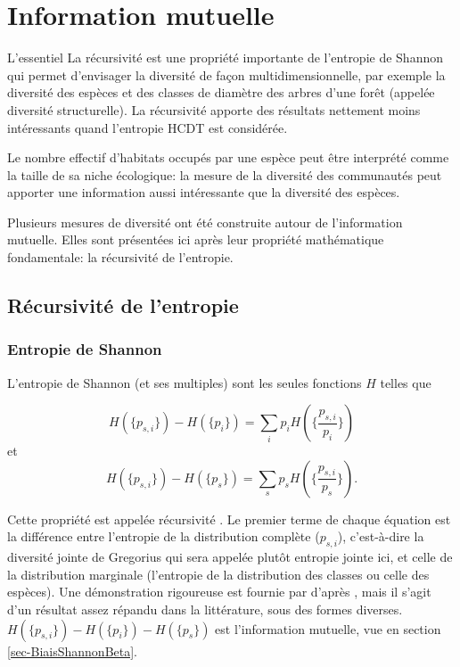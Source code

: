\documentclass[
  11pt,
  french,
  a4paper,
  extrafontsizes,onecolumn,openright
  ]{memoir}
\newenvironment{Summary}
  {\begin{bclogo}[logo=\bctrombone, noborder=true, couleur=lightgray!50]{L'essentiel}\parindent0pt}
  {\end{bclogo}}
\begin{document}
\normalsize

\chapter{Information mutuelle}\label{information-mutuelle}

\begin{Summary}
La récursivité est une propriété importante de l'entropie de Shannon qui permet d'envisager la diversité de façon multidimensionnelle, par exemple la diversité des espèces et des classes de diamètre des arbres d'une forêt (appelée diversité structurelle). La récursivité apporte des résultats nettement moins intéressants quand l'entropie HCDT est considérée.

Le nombre effectif d'habitats occupés par une espèce peut être interprété comme la taille de sa niche écologique: la mesure de la diversité des communautés peut apporter une information aussi intéressante que la diversité des espèces.

\end{Summary}

Plusieurs mesures de diversité ont été construite autour de l'information mutuelle.
Elles sont présentées ici après leur propriété mathématique fondamentale: la récursivité de l'entropie.

\section{Récursivité de l'entropie}\label{ruxe9cursivituxe9-de-lentropie}

\subsection{Entropie de Shannon}\label{sec-jointeShannon}

L'entropie de Shannon (et ses multiples) sont les seules fonctions \(H\) telles que

\begin{equation}
  \label{eq:Recursivite1}
  H\left(\{p_{s,i}\}\right)-H\left(\{p_i\}\right) 
  = \sum_i{p_i H\left(\{\frac{p_{s,i}}{p_i}\}\right)}
\end{equation}
et
\begin{equation}
  \label{eq:Recursivite2}
  H\left(\{p_{s,i}\}\right)-H\left(\{p_s\}\right) 
  = \sum_s{p_s H\left(\{\frac{p_{s,i}}{p_s}\}\right)}.
\end{equation}

Cette propriété est appelée récursivité \autocite{Bacaro2013}.
Le premier terme de chaque équation est la différence entre l'entropie de la distribution complète (\(p_{s,i}\)), c'est-à-dire la diversité jointe de Gregorius qui sera appelée plutôt entropie jointe ici, et celle de la distribution marginale (l'entropie de la distribution des classes ou celle des espèces).
Une démonstration rigoureuse est fournie par \textcite{Baez2011} d'après \textcite{Faddeev1956}, mais il s'agit d'un résultat assez répandu dans la littérature, sous des formes diverses\autocite{Aczel1975,Renyi1961,Bourguignon1979}.
\(H(\{p_{s,i}\})-H(\{p_i\})-H(\{p_s\})\) est l'information mutuelle, vue en section \ref{sec-BiaisShannonBeta}.
\end{document}
